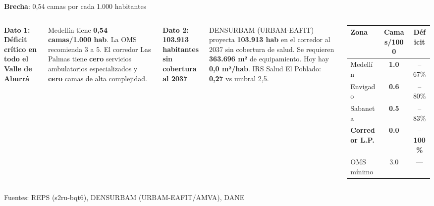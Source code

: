 \documentclass[aspectratio=169, 12pt]{beamer}
\newcommand{\eqvar}[2]{\textcolor{#1}{\textbf{#2}}}
\begin{document}
{
\begin{frame}{\eqvar{brecha}{Brecha}: 0,54 camas por cada 1.000 habitantes}

\begin{columns}[T]
\vspace{-2pt}

{\footnotesize\textbf{Dato 1: Déficit crítico en todo el Valle de Aburrá}}

\vspace{4pt}
{\scriptsize
Medellín tiene \textcolor{brecha}{\textbf{0,54 camas/1.000 hab}}. La OMS recomienda 3 a 5. El corredor Las Palmas tiene \textcolor{brecha}{\textbf{cero}} servicios ambulatorios especializados y \textcolor{brecha}{\textbf{cero}} camas de alta complejidad.
}

\vspace{8pt}
{\footnotesize\textbf{Dato 2: 103.913 habitantes sin cobertura al 2037}}

\vspace{4pt}
{\scriptsize
DENSURBAM (URBAM-EAFIT) proyecta \textbf{103.913 hab} en el corredor al 2037 sin cobertura de salud. Se requieren \textbf{363.696 m²} de equipamiento. Hoy hay \textcolor{brecha}{\textbf{0,0 m²/hab}}. IRS Salud El Poblado: \textcolor{brecha}{\textbf{0,27}} vs umbral 2,5.
}

\vspace{4pt}
{\scriptsize
\begin{tabular}{@{}lcc@{}}
\toprule
\textbf{Zona} & \textbf{Camas/1000} & \textbf{Déficit} \\
\midrule
\rowcolor{brecha!10}
Medellín & \textcolor{brecha}{\textbf{1.0}} & --67\% \\
\rowcolor{brecha!10}
Envigado & \textcolor{brecha}{\textbf{0.6}} & --80\% \\
\rowcolor{brecha!10}
Sabaneta & \textcolor{brecha}{\textbf{0.5}} & --83\% \\
\rowcolor{brecha!15}
\textbf{Corredor L.P.} & \textcolor{brecha}{\textbf{0.0}} & \textcolor{brecha}{\textbf{--100\%}} \\
\midrule
OMS mínimo & 3.0 & --- \\
\bottomrule
\end{tabular}
}

\vspace{6pt}
\end{columns}

\vspace{2pt}
{\tiny\textcolor{riesgo}{Fuentes: REPS (s2ru-bqt6), DENSURBAM (URBAM-EAFIT/AMVA), DANE}}
\end{frame}
}
\end{document}
